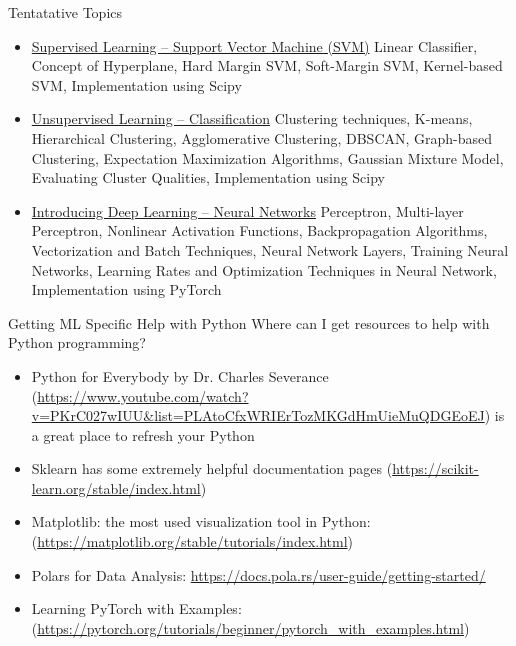 \documentclass[aspectratio=169,xcolor=dvipsnames,svgnames,x11names,fleqn]{beamer}
\begin{document}
\begin{frame}{Tentatative Topics}
\begin{itemize}
    \item   \color{DarkRed}  \underline{Supervised Learning -- Support Vector Machine (SVM)} Linear Classifier, Concept of Hyperplane, Hard Margin SVM, Soft-Margin SVM, Kernel-based SVM, Implementation using Scipy
      
   

     \item  \color{DarkRed} \underline{Unsupervised Learning -- Classification} Clustering techniques, K-means, Hierarchical Clustering, Agglomerative Clustering, DBSCAN, Graph-based Clustering, Expectation Maximization Algorithms, Gaussian Mixture Model, Evaluating Cluster Qualities, Implementation using Scipy

      \item  \color{DarkRed} \underline{Introducing Deep Learning -- Neural Networks} Perceptron, Multi-layer Perceptron, Nonlinear Activation Functions, Backpropagation Algorithms, Vectorization and Batch Techniques, Neural Network Layers, Training Neural Networks, Learning Rates and Optimization Techniques in Neural Network, Implementation using PyTorch
    
   
\end{itemize}
\end{frame}

\begin{frame}{Getting ML Specific Help with Python}
Where can I get resources to help with Python programming?
\begin{itemize}
    \item Python for Everybody by Dr. Charles Severance ({\color{MediumRed}\url{https://www.youtube.com/watch?v=PKrC027wIUU&list=PLAtoCfxWRIErTozMKGdHmUieMuQDGEoEJ}}) is a great place to refresh your Python
    \item Sklearn has some extremely helpful documentation pages ({\color{MediumRed}\url{https://scikit-learn.org/stable/index.html}})
    \item Matplotlib: the most used visualization tool in Python: ({\color{MediumRed}\url{https://matplotlib.org/stable/tutorials/index.html}})

	\item Polars for Data Analysis: {\color{MediumRed}\url{https://docs.pola.rs/user-guide/getting-started/}}

    \item Learning PyTorch with Examples: 
    ({\color{MediumRed}\url{https://pytorch.org/tutorials/beginner/pytorch_with_examples.html}})
\end{itemize} 


\end{frame}
\end{document}
